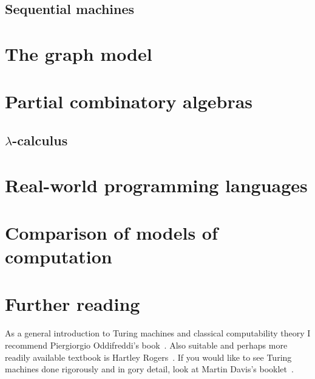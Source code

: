 \subsection{Sequential machines}
\label{sec:sequential-machines}


\section{The graph model}
\label{sec:graph-model}


\section{Partial combinatory algebras}
\label{sec:pcas}

\subsection{$\lambda$-calculus}
\label{sec:lambda-calculus}




\section{Real-world programming languages}
\label{sec:programming-languages}


\section{Comparison of models of computation}
\label{sec:models-comparison}



\section{Further reading}
\label{sec:models-further-reading}

As a general introduction to Turing machines and classical
computability theory I recommend Piergiorgio Oddifreddi's
book~\cite{Oddifreddi}. Also suitable and perhaps more readily
available textbook is Hartley Rogers~\cite{Rogers}. If you would like
to see Turing machines done rigorously and in gory detail, look at
Martin Davis's booklet~\cite{Davis}.



